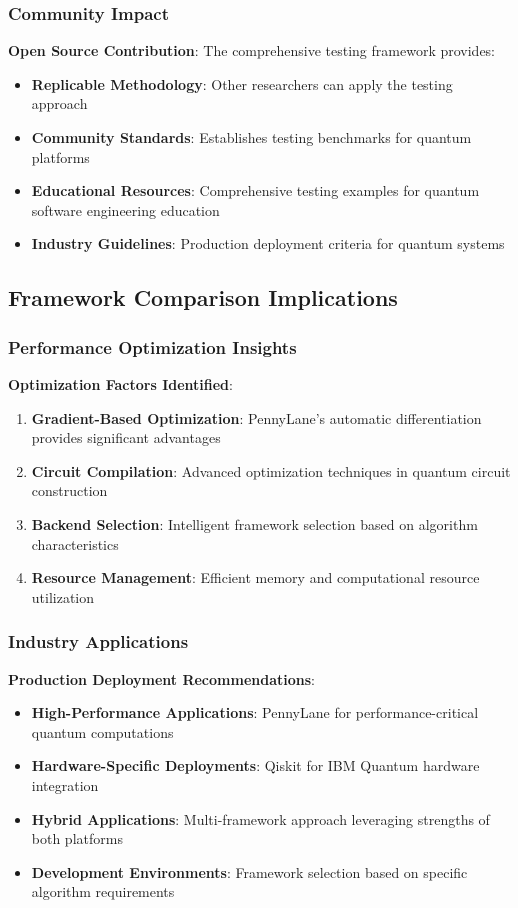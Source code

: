 \documentclass[12pt,a4paper]{article}
\begin{document}
\subsubsection{Community Impact}

\textbf{Open Source Contribution}: The comprehensive testing framework provides:
\begin{itemize}
\item \textbf{Replicable Methodology}: Other researchers can apply the testing approach
\item \textbf{Community Standards}: Establishes testing benchmarks for quantum platforms
\item \textbf{Educational Resources}: Comprehensive testing examples for quantum software engineering education
\item \textbf{Industry Guidelines}: Production deployment criteria for quantum systems
\end{itemize}

\subsection{Framework Comparison Implications}

\subsubsection{Performance Optimization Insights}

\textbf{Optimization Factors Identified}:
\begin{enumerate}
\item \textbf{Gradient-Based Optimization}: PennyLane's automatic differentiation provides significant advantages
\item \textbf{Circuit Compilation}: Advanced optimization techniques in quantum circuit construction
\item \textbf{Backend Selection}: Intelligent framework selection based on algorithm characteristics
\item \textbf{Resource Management}: Efficient memory and computational resource utilization
\end{enumerate}

\subsubsection{Industry Applications}

\textbf{Production Deployment Recommendations}:
\begin{itemize}
\item \textbf{High-Performance Applications}: PennyLane for performance-critical quantum computations
\item \textbf{Hardware-Specific Deployments}: Qiskit for IBM Quantum hardware integration
\item \textbf{Hybrid Applications}: Multi-framework approach leveraging strengths of both platforms
\item \textbf{Development Environments}: Framework selection based on specific algorithm requirements
\end{itemize}
\end{document}

